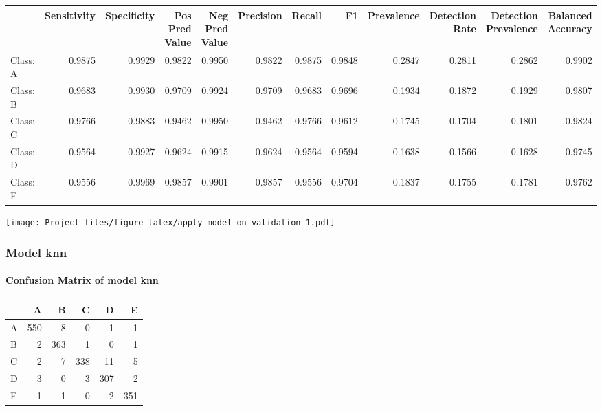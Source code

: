 \documentclass[]{article}
\let\oldparagraph\paragraph
\renewcommand{\paragraph}[1]{\oldparagraph{#1}\mbox{}}
\begin{document}
\begin{tabular}{l|r|r|r|r|r|r|r|r|r|r|r}
\hline
  & Sensitivity & Specificity & Pos Pred Value & Neg Pred Value & Precision & Recall & F1 & Prevalence & Detection Rate & Detection Prevalence & Balanced Accuracy\\
\hline
Class: A & 0.9875 & 0.9929 & 0.9822 & 0.9950 & 0.9822 & 0.9875 & 0.9848 & 0.2847 & 0.2811 & 0.2862 & 0.9902\\
\hline
Class: B & 0.9683 & 0.9930 & 0.9709 & 0.9924 & 0.9709 & 0.9683 & 0.9696 & 0.1934 & 0.1872 & 0.1929 & 0.9807\\
\hline
Class: C & 0.9766 & 0.9883 & 0.9462 & 0.9950 & 0.9462 & 0.9766 & 0.9612 & 0.1745 & 0.1704 & 0.1801 & 0.9824\\
\hline
Class: D & 0.9564 & 0.9927 & 0.9624 & 0.9915 & 0.9624 & 0.9564 & 0.9594 & 0.1638 & 0.1566 & 0.1628 & 0.9745\\
\hline
Class: E & 0.9556 & 0.9969 & 0.9857 & 0.9901 & 0.9857 & 0.9556 & 0.9704 & 0.1837 & 0.1755 & 0.1781 & 0.9762\\
\hline
\end{tabular}

\endgroup{}

\texttt{[image: Project\_files/figure-latex/apply\_model\_on\_validation-1.pdf]}

\subsubsection{Model knn}\label{model-knn}

\paragraph{Confusion Matrix of model
knn}\label{confusion-matrix-of-model-knn}

\begin{table}[H]
\centering
\begin{tabular}{l|r|r|r|r|r}
\hline
  & A & B & C & D & E\\
\hline
A & 550 & 8 & 0 & 1 & 1\\
\hline
B & 2 & 363 & 1 & 0 & 1\\
\hline
C & 2 & 7 & 338 & 11 & 5\\
\hline
D & 3 & 0 & 3 & 307 & 2\\
\hline
E & 1 & 1 & 0 & 2 & 351\\
\hline
\end{tabular}
\end{table}
\end{document}
